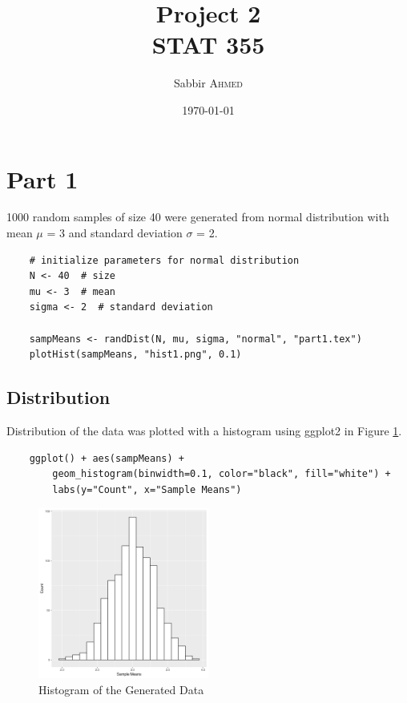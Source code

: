 \documentclass[paper=a4, fontsize=11pt]{article}
\title{Project 2 \\ STAT 355}  %
\author{Sabbir \textsc{Ahmed}}  %
\date{\today}  %
\begin{document}
    \maketitle %

    \section{Part 1}
        1000 random samples of size 40 were generated from normal distribution with mean $\mu$ = 3 and standard deviation $\sigma$ = 2.

\begin{lstlisting}
    # initialize parameters for normal distribution
    N <- 40  # size
    mu <- 3  # mean
    sigma <- 2  # standard deviation

    sampMeans <- randDist(N, mu, sigma, "normal", "part1.tex")
    plotHist(sampMeans, "hist1.png", 0.1)
\end{lstlisting}

        

        \subsection{Distribution}
            Distribution of the data was plotted with a histogram using ggplot2 in Figure \ref{fig:hist1}.
\begin{lstlisting}
    ggplot() + aes(sampMeans) + 
        geom_histogram(binwidth=0.1, color="black", fill="white") +
        labs(y="Count", x="Sample Means")
\end{lstlisting}

            \begin{figure}[!h]
                \begin{center}
                    \includegraphics[width=0.5\textwidth]{figures/hist1.png}
                    \caption{Histogram of the Generated Data} \label{fig:hist1}
                \end{center}
            \end{figure}
\end{document}
